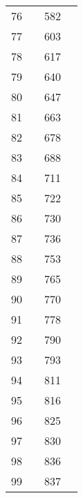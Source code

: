 \begin{table}
\begin{tabular}{cccc}
  76  &    & 582 &      \\
  77  &    & 603 &      \\
  78  &    & 617 &      \\
  79  &    & 640 &      \\
  80  &    & 647 &      \\
  81  &    & 663 &      \\
  82  &    & 678 &      \\
  83  &    & 688 &      \\
  84  &    & 711 &      \\
  85  &    & 722 &      \\
  86  &    & 730 &      \\
  87  &    & 736 &      \\
  88  &    & 753 &      \\
  89  &    & 765 &      \\
  90  &    & 770 &      \\
  91  &    & 778 &      \\
  92  &    & 790 &      \\
  93  &    & 793 &      \\
  94  &    & 811 &      \\
  95  &    & 816 &      \\
  96  &    & 825 &      \\
  97  &    & 830 &      \\
  98  &    & 836 &      \\
  99  &    & 837 &      \\
  \end{tabular} 
\end{table}


